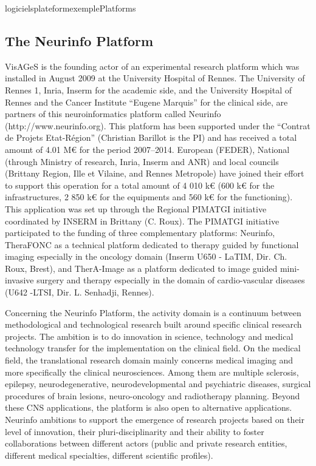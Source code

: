\documentclass{ra2018}
\begin{document}
 \begin{module}{logiciels}{plateformexemple}{Platforms}  

\subsection{The Neurinfo Platform}

VisAGeS is the founding actor of an experimental research platform which was installed in August 2009 at the University Hospital of Rennes. The University of Rennes 1, Inria, Inserm for the academic side, and the University Hospital of Rennes and the Cancer Institute “Eugene Marquis” for the clinical side, are partners of this neuroinformatics platform called Neurinfo (http://www.neurinfo.org). This platform has been supported under the “Contrat de Projets Etat-Région” (Christian Barillot is the PI) and has received a total amount of 4.01 M€ for the period 2007–2014. European (FEDER), National (through Ministry of research, Inria, Inserm and ANR) and local councils (Brittany Region, Ille et Vilaine, and Rennes Metropole) have joined their effort to support this operation for a total amount of 4 010 k€ (600 k€ for the infrastructures, 2 850 k€ for the equipments and 560 k€ for the functioning). This application was set up through the Regional PIMATGI initiative coordinated by INSERM in Brittany (C. Roux). The PIMATGI initiative participated to the funding of three complementary platforms: Neurinfo, TheraFONC as a technical platform dedicated to therapy guided by functional imaging especially in the oncology domain (Inserm U650 - LaTIM, Dir. Ch. Roux, Brest), and TherA-Image as a platform dedicated to image guided mini-invasive surgery and therapy especially in the domain of cardio-vascular diseases (U642 -LTSI, Dir. L. Senhadji, Rennes).

Concerning the Neurinfo Platform, the activity domain is a continuum between methodological and technological research built around specific clinical research projects. The ambition is to do innovation in science, technology and medical technology transfer for the implementation on the clinical field. On the medical field, the translational research domain mainly concerns medical imaging and more specifically the clinical neurosciences. Among them are multiple sclerosis, epilepsy, neurodegenerative, neurodevelopmental and psychiatric diseases, surgical procedures of brain lesions, neuro-oncology and radiotherapy planning. Beyond these CNS applications, the platform is also open to alternative applications. Neurinfo ambitions to support the emergence of research projects based on their level of innovation, their pluri-disciplinarity and their ability to foster collaborations between different actors (public and private research entities, different medical specialties, different scientific profiles).


\end{module}
\end{document}
